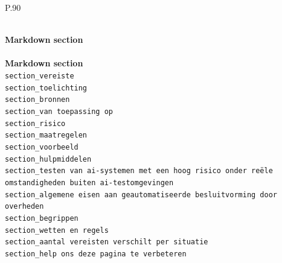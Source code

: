 \begingroup
\small
\renewcommand{\arraystretch}{1.10}
\setlength{\LTcapwidth}{\textwidth}
\setlength{\LTleft}{0pt plus 1fill}
\setlength{\LTright}{0pt plus 1fill}
\begin{longtable}{P{.90\textwidth}}
\caption{Markdown sections identified in Algoritmekader requirement files.}
\label{tab:v1-algoritmekader-section-fields} \\
\toprule
\textbf{Markdown section} \\
\midrule
\endfirsthead
{} \\
\toprule
\textbf{Markdown section} \\
\midrule
\endhead
\bottomrule
\endlastfoot
\texttt{section\_\allowbreak{}vereiste} \\
\texttt{section\_\allowbreak{}toelichting} \\
\texttt{section\_\allowbreak{}bronnen} \\
\texttt{section\_\allowbreak{}van toepassing op} \\
\texttt{section\_\allowbreak{}risico} \\
\texttt{section\_\allowbreak{}maatregelen} \\
\texttt{section\_\allowbreak{}voorbeeld} \\
\texttt{section\_\allowbreak{}hulpmiddelen} \\
\texttt{section\_\allowbreak{}testen van ai-\allowbreak{}systemen met een hoog risico onder reële omstandigheden buiten ai-\allowbreak{}testomgevingen} \\
\texttt{section\_\allowbreak{}algemene eisen aan geautomatiseerde besluitvorming door overheden} \\
\texttt{section\_\allowbreak{}begrippen} \\
\texttt{section\_\allowbreak{}wetten en regels} \\
\texttt{section\_\allowbreak{}aantal vereisten verschilt per situatie} \\
\texttt{section\_\allowbreak{}help ons deze pagina te verbeteren} \\
\end{longtable}
\endgroup